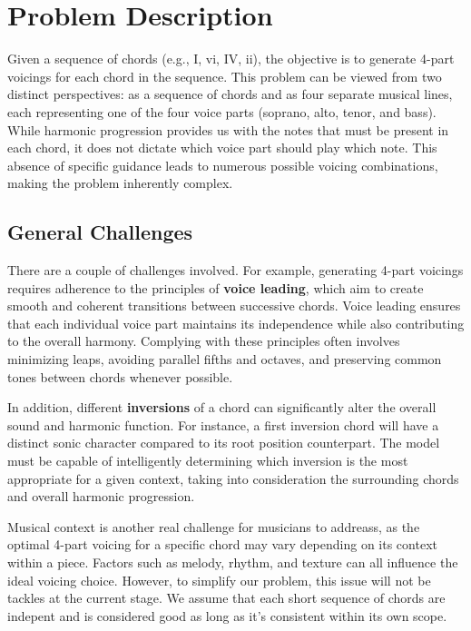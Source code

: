 \documentclass[12pt, letterpaper]{article}
\begin{document}
\section{Problem Description}

Given a sequence of chords (e.g., I, vi, IV, ii), the objective is to generate 4-part voicings for each chord in the sequence. This problem can be viewed from two distinct perspectives: as a sequence of chords and as four separate musical lines, each representing one of the four voice parts (soprano, alto, tenor, and bass). While harmonic progression provides us with the notes that must be present in each chord, it does not dictate which voice part should play which note. This absence of specific guidance leads to numerous possible voicing combinations, making the problem inherently complex.

\subsection{General Challenges}

There are a couple of challenges involved. For example, generating 4-part voicings requires adherence to the principles of \textbf{voice leading}, which aim to create smooth and coherent transitions between successive chords. Voice leading ensures that each individual voice part maintains its independence while also contributing to the overall harmony. Complying with these principles often involves minimizing leaps, avoiding parallel fifths and octaves, and preserving common tones between chords whenever possible.

In addition, different \textbf{inversions} of a chord can significantly alter the overall sound and harmonic function. For instance, a first inversion chord will have a distinct sonic character compared to its root position counterpart. The model must be capable of intelligently determining which inversion is the most appropriate for a given context, taking into consideration the surrounding chords and overall harmonic progression.

Musical context is another real challenge for musicians to addreass, as the optimal 4-part voicing for a specific chord may vary depending on its context within a piece. Factors such as melody, rhythm, and texture can all influence the ideal voicing choice. However, to simplify our problem, this issue will not be tackles at the current stage. We assume that each short sequence of chords are indepent and is considered good as long as it's consistent within its own scope.
\end{document}

